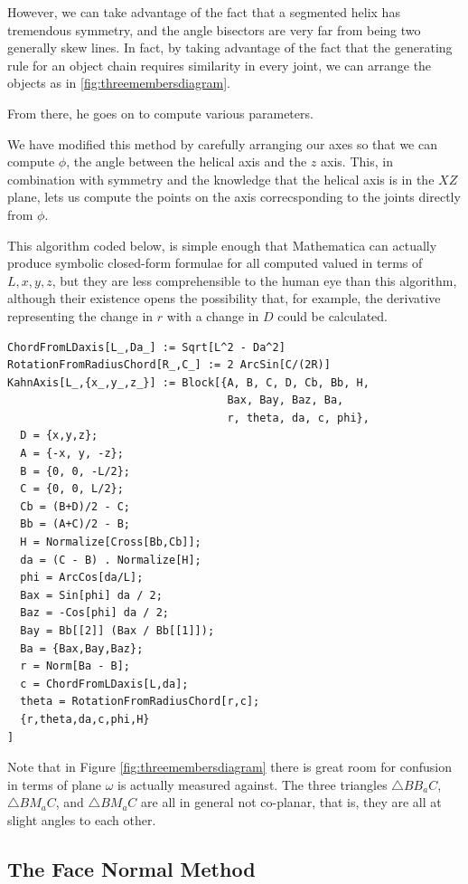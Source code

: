 \documentclass[11pt]{article}
\begin{document}
{However, we can take advantage of the fact that a segmented helix has
tremendous symmetry, and the angle bisectors are very far from being two
generally skew lines. In fact, by taking advantage of the fact that the
generating rule for an object chain requires similarity in every joint,
we can arrange the objects as in \ref{fig:threemembersdiagram}.

From there, he goes on to compute various parameters.

We have modified this method by carefully arranging our axes
so that we can compute $\phi$, the angle between the helical axis
and the $z$ axis. This, in combination with symmetry and the knowledge
that the helical axis is in the $XZ$ plane, lets us compute the
points on the axis correcsponding to the joints directly from $\phi$.

This algorithm coded below, is simple enough that Mathematica can
actually produce symbolic closed-form formulae for all computed valued
in terms of $L, x, y, z$, but they are less comprehensible to the
human eye than this algorithm, although their existence opens
the possibility that, for example, the derivative representing
the change in $r$ with a change in $D$ could be calculated.
\begin{lstlisting}
ChordFromLDaxis[L_,Da_] := Sqrt[L^2 - Da^2]
RotationFromRadiusChord[R_,C_] := 2 ArcSin[C/(2R)]
KahnAxis[L_,{x_,y_,z_}] := Block[{A, B, C, D, Cb, Bb, H,
                                  Bax, Bay, Baz, Ba, 
                                  r, theta, da, c, phi},
  D = {x,y,z};
  A = {-x, y, -z};
  B = {0, 0, -L/2};
  C = {0, 0, L/2};
  Cb = (B+D)/2 - C;
  Bb = (A+C)/2 - B;
  H = Normalize[Cross[Bb,Cb]];
  da = (C - B) . Normalize[H];
  phi = ArcCos[da/L];
  Bax = Sin[phi] da / 2;
  Baz = -Cos[phi] da / 2;
  Bay = Bb[[2]] (Bax / Bb[[1]]);
  Ba = {Bax,Bay,Baz};
  r = Norm[Ba - B];
  c = ChordFromLDaxis[L,da];
  theta = RotationFromRadiusChord[r,c];
  {r,theta,da,c,phi,H}
]
\end{lstlisting}


Note that in Figure \ref{fig:threemembersdiagram} there is great
room for confusion in terms of plane $\omega$ is actually
measured against. The three triangles $\triangle BB_aC$, $\triangle BM_aC$, and $\triangle BM_aC$
are all in general not co-planar, that is, they are all at
slight angles to each other.  

\subsection{The Face Normal Method}

}
\end{document}
